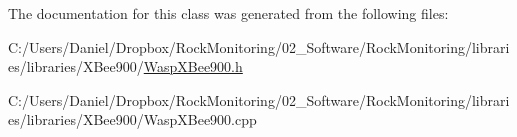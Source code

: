 The documentation for this class was generated from the following files\+:\begin{DoxyCompactItemize}
\item 
C\+:/\+Users/\+Daniel/\+Dropbox/\+Rock\+Monitoring/02\+\_\+\+Software/\+Rock\+Monitoring/libraries/libraries/\+X\+Bee900/\hyperlink{_wasp_x_bee900_8h}{Wasp\+X\+Bee900.\+h}\item 
C\+:/\+Users/\+Daniel/\+Dropbox/\+Rock\+Monitoring/02\+\_\+\+Software/\+Rock\+Monitoring/libraries/libraries/\+X\+Bee900/Wasp\+X\+Bee900.\+cpp\end{DoxyCompactItemize}
